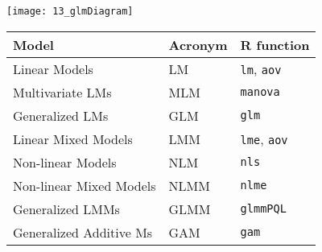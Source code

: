 \begin{frame}
  \begin{center}
    \texttt{[image: 13\_glmDiagram]}\\
    \begin{footnotesize}
      \begin{tabular}{lll}
        \hline
        Model & Acronym & R function \\
        \hline
        \color{darkgreen}Linear Models             & \color{darkgreen}LM   & \color{darkgreen}\texttt{lm}, \texttt{aov}\\
        \color{darkblue}Multivariate LMs           & \color{darkblue}MLM   & \color{darkblue}\texttt{manova} \\
        \color{darkgreen}Generalized LMs           & \color{darkgreen}GLM  & \color{darkgreen}\texttt{glm} \\
        \color{circlered}Linear Mixed Models       & \color{circlered}LMM  & \color{circlered}\texttt{lme}, \texttt{aov} \\
        \color{darkgreen}Non-linear Models         & \color{darkgreen}NLM  & \color{darkgreen}\texttt{nls} \\
        \color{circlered}Non-linear Mixed Models   & \color{circlered}NLMM & \color{circlered}\texttt{nlme} \\
        \color{circlered}Generalized LMMs          & \color{circlered}GLMM & \color{circlered}\texttt{glmmPQL} \\
        \color{darkgreen}Generalized Additive Ms   & \color{darkgreen}GAM  & \color{darkgreen}\texttt{gam} \\
        \hline
      \end{tabular} 
    \end{footnotesize}
  \end{center}
\end{frame}









